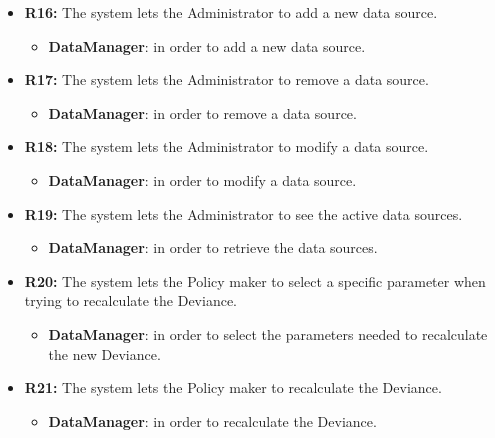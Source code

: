 \begin{itemize}
\item \textbf{R16:} The system lets the Administrator to add a new data source.

\begin{itemize}
    \item \textbf{DataManager}: in order to add a new data source.
\end{itemize}

\item \textbf{R17:} The system lets the Administrator to remove a data source.

\begin{itemize}
    \item \textbf{DataManager}: in order to remove a data source.
\end{itemize}

\item \textbf{R18:} The system lets the Administrator to modify a data source.

\begin{itemize}
    \item \textbf{DataManager}: in order to modify a data source.
\end{itemize}

\item \textbf{R19:} The system lets the Administrator to see the active data sources.

\begin{itemize}
    \item \textbf{DataManager}: in order to retrieve the data sources.
\end{itemize}

\item \textbf{R20:} The system lets the Policy maker to select a specific parameter when trying to recalculate the Deviance.

\begin{itemize}
    \item \textbf{DataManager}: in order to select the parameters needed to recalculate the new Deviance.
\end{itemize}

\item \textbf{R21:} The system lets the Policy maker to recalculate the Deviance.

\begin{itemize}
    \item \textbf{DataManager}: in order to recalculate the Deviance.
\end{itemize}


\end{itemize}
